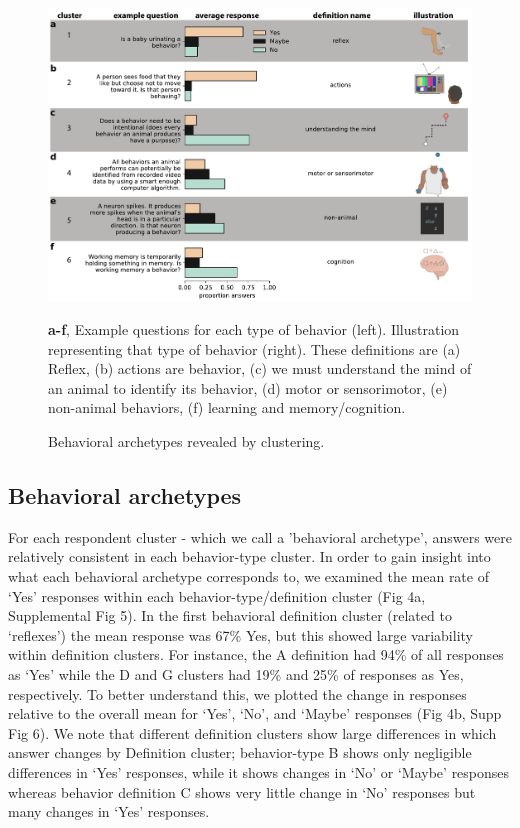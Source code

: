 \documentclass[a4paper, 11pt]{article}
\begin{document}
\begin{figure}
\centerline{\includegraphics[width=\textwidth]{fig3.pdf}}
\caption{Behavioral archetypes revealed by clustering.} \textbf{a-f}, Example questions for each type of behavior (left). Illustration representing that type of behavior (right). These definitions are (a) Reflex, (b) actions are behavior, (c) we must understand the mind of an animal to identify its behavior, (d) motor or sensorimotor, (e) non-animal behaviors, (f) learning and memory/cognition.
\end{figure}

\subsection*{Behavioral archetypes}

For each respondent cluster - which we call a 'behavioral archetype', answers were relatively consistent in each behavior-type cluster. In order to gain insight into what each behavioral archetype corresponds to, we examined the mean rate  of `Yes' responses within each behavior-type/definition cluster (Fig 4a, Supplemental Fig 5). In the first behavioral definition cluster (related to `reflexes') the mean response was 67\% Yes, but this showed large variability within definition clusters. For instance, the A definition had 94\% of all responses as `Yes' while the D and G clusters had 19\% and 25\% of responses as Yes, respectively. To better understand this, we plotted the change in responses relative to the overall mean for `Yes', `No', and `Maybe' responses (Fig 4b, Supp Fig 6). We note that different definition clusters show large differences in which answer changes by Definition cluster; behavior-type B shows only negligible differences in `Yes' responses, while it shows changes in `No' or `Maybe' responses whereas behavior definition C shows very little change in `No' responses but many changes in `Yes' responses.
\end{document}
